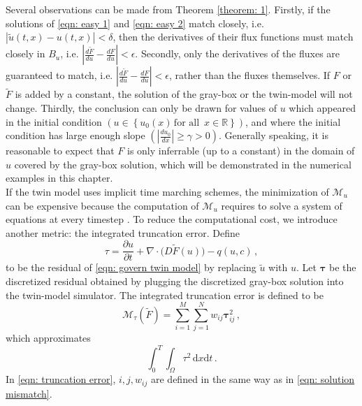 Several observations can be made from Theorem \ref{theorem: 1}.
Firstly, if the solutions of \eqref{eqn: easy 1} and \eqref{eqn: easy 2} match closely, i.e.
$|\tilde{u}(t,x)-u(t,x)| < \delta$, then
the derivatives of their flux functions must match closely in $B_u$, i.e.
$\left|\frac{d\tilde{F}}{du} - \frac{dF}{du}\right| < \epsilon$. 
Secondly, only the derivatives of the fluxes are guaranteed to match, i.e.
$\left|\frac{d\tilde{F}}{du} - \frac{dF}{du}\right| < \epsilon$,
rather than the fluxes themselves. 
If $F$ or $\tilde{F}$ is added by a constant, the solution of the gray-box or the twin-model
will not change.
Thirdly, the conclusion 
can only be drawn for values of $u$ which appeared in the initial condition 
$\left(u\in \left\{u_0(x)\, \textrm{for all } \, x\in \mathbb{R}\right\}\right)$, 
and where the initial condition has large enough slope $\left(\left|\frac{du_0}{dx}\right|\ge \gamma > 0\right)$.
Generally speaking, 
it is reasonable to expect
that $F$ is only inferrable (up to a constant) in the domain of $u$ covered by the gray-box 
solution, which will be demonstrated in the numerical examples in this chapter.\\


If the twin model uses implicit time marching schemes,
the minimization of $\mathcal{M}_u$ can be expensive because the computation of $\mathcal{M}_u$ 
requires to solve a system of equations at every timestep \cite{PDE theory}.
To reduce the computational cost, we introduce another metric:
the integrated truncation error.
Define
\begin{equation}
    \tau = \frac{\partial u}{\partial t} 
    + \nabla \cdot \big(D \tilde{F}(u)\big) - q(u,c)\,,
    \label{eqn: residual}
\end{equation}
to be the residual of \eqref{eqn: govern twin model}
by replacing $\tilde{u}$ with $u$.
Let $\boldsymbol{\tau}$ be the discretized residual obtained by plugging the discretized 
gray-box solution into the twin-model simulator.
The integrated truncation error is defined to be
\begin{equation}
    \mathcal{M}_{\tau}(\tilde{F}) = \sum_{i=1}^M \sum_{j=1}^N w_{ij} \boldsymbol{\tau}_{ij}^2 \,,
    \label{eqn: truncation error}
\end{equation}
which approximates
\begin{equation}
    \int_0^T \int_\Omega \tau^2 \, \textrm{d}x\textrm{d}t\,.
    \label{eqn: integrated residual}
\end{equation}
In \eqref{eqn: truncation error}, 
$i, j, w_{ij}$ are defined in the same way as in \eqref{eqn: solution mismatch}.\\

